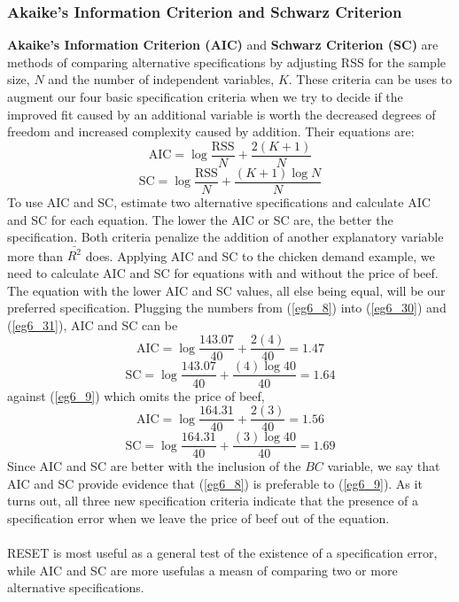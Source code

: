 \documentclass[11pt]{article}
\begin{document}
\subsubsection{Akaike's Information Criterion and Schwarz Criterion}
\textbf{Akaike's Information Criterion (AIC)} and \textbf{Schwarz Criterion (SC)} are methods of comparing alternative specifications by adjusting RSS for the sample size, $N$ and the number of independent variables, $K$. These criteria can be uses to augment our four basic specification criteria when we try to decide if the improved fit caused by an additional variable is worth the decreased degrees of freedom and increased complexity caused by addition. Their equations are:
\begin{equation}
\text{AIC} = \log \frac{\text{RSS}}{N} + \frac{2(K+1)}{N} \label{eg6_30}
\end{equation}
\begin{equation}
\text{SC} = \log \frac{\text{RSS}}{N} + \frac{(K+1)\log N}{N} \label{eg6_31}
\end{equation}
To use AIC and SC, estimate two alternative specifications and calculate AIC and SC for each equation. The lower the AIC or SC are, the better the specification. Both criteria penalize the addition of another explanatory variable more than $\bar{R^2}$ does. Applying AIC and SC to the chicken demand example, we need to calculate AIC and SC for equations with and without the price of beef. The equation with the lower AIC and SC values, all else being equal, will be our preferred specification. Plugging the numbers from (\ref{eg6_8}) into (\ref{eg6_30}) and (\ref{eg6_31}), AIC and SC can be
$$
\text{AIC} = \log \frac{\text{143.07}}{40} + \frac{2(4)}{40} = 1.47
$$
$$
\text{SC} = \log \frac{\text{143.07}}{40} + \frac{(4)\log 40}{40} = 1.64
$$
against (\ref{eg6_9}) which omits the price of beef,
$$
\text{AIC} = \log \frac{\text{164.31}}{40} + \frac{2(3)}{40} = 1.56
$$
$$
\text{SC} = \log \frac{\text{164.31}}{40} + \frac{(3)\log 40}{40} = 1.69
$$
Since AIC and SC are better with the inclusion of the $BC$ variable, we say that AIC and SC provide evidence that (\ref{eg6_8}) is preferable to (\ref{eg6_9}).
As it turns out, all three new specification criteria indicate that the presence of a specification error when we leave the price of beef out of the equation. \\ \\
RESET is most useful as a general test of the existence of a specification error, while AIC and SC are more usefulas a measn of comparing two or more alternative specifications.
\clearpage
\end{document}
